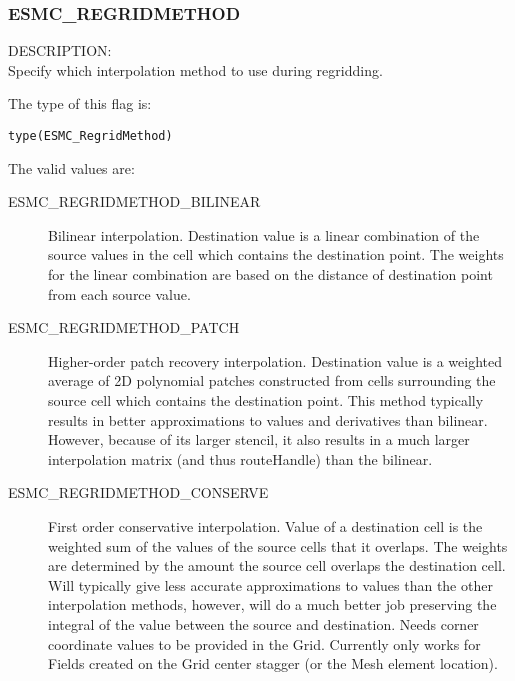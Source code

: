 
\subsubsection{ESMC\_REGRIDMETHOD}
\label{opt:cregridmethod}

{\sf DESCRIPTION:\\}  
Specify which interpolation method to use during regridding. 

The type of this flag is:

{\tt type(ESMC\_RegridMethod)}

The valid values are:
\begin{description}
\item [ESMC\_REGRIDMETHOD\_BILINEAR]
      Bilinear interpolation. Destination value is a linear combination of the source values in the cell which contains the destination point. The weights for the linear combination are based on the distance of destination point from each source value. 
\item [ESMC\_REGRIDMETHOD\_PATCH]
      Higher-order patch recovery interpolation. Destination value is a weighted average of 2D polynomial patches constructed from cells surrounding the source cell which contains the destination point. This method typically results in better approximations to values and derivatives than bilinear. However, because of its larger stencil, it also results in a much larger interpolation matrix (and thus routeHandle) than the bilinear. 
\item [ESMC\_REGRIDMETHOD\_CONSERVE]
      First order conservative interpolation. Value of a destination cell is the weighted sum of the values of the source cells that it overlaps. The weights are determined by the amount the source cell overlaps the destination cell. Will typically give less accurate approximations to values than the other interpolation methods, however, will do a much better job preserving the integral of the value between the source and destination.  Needs corner coordinate values to be provided in the Grid. Currently only works for Fields created on the Grid center stagger (or the Mesh element location). 
\end{description}
